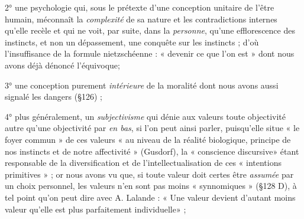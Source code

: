 2° une psychologie qui, sous le prétexte d’une conception unitaire
de l’être humain, méconnaît la {\it complexité} de sa nature et les contradictions
internes qu’elle recèle et qui ne voit, par suite, dans la
{\it personne}, qu’une efflorescence des instincts, et non un dépassement,
une conquête sur les instincts ; d’où l’insuffisance de la formule
nietzschéenne : « devenir ce que l’on est » dont nous avons déjà
dénoncé l’équivoque;

3° une conception purement {\it intérieure} de la moralité dont nous
avons aussi signalé les dangers (\S 126) ;

4° plus généralement, un {\it subjectivisme} qui dénie aux valeurs toute
objectivité autre qu’une objectivité par {\it en bas}, si l’on peut ainsi parler,
puisqu’elle situe « le foyer commun » de ces valeurs « au niveau
de la réalité biologique, principe de nos instincts et de notre affectivité »
(Gusdorf), la « conscience discursive» étant responsable de
la diversification et de l’intellectualisation de ces « intentions primitives » ;
or nous avons vu que, si toute valeur doit certes être {\it assumée}
par un choix personnel, les valeurs n’en sont pas moins « synnomiques »
(\S 128 D), à tel point qu’on peut dire avec A. Lalande :
« Une valeur devient d’autant moins valeur qu’elle est plus parfaitement
individuelle» ;

